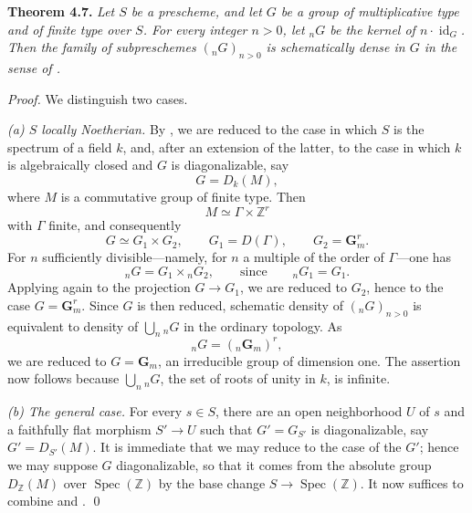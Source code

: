 \medskip
\noindent{}\textbf{Theorem 4.7.}
\textit{Let \(S\) be a prescheme, and let \(G\) be a group of
multiplicative type and of finite type over \(S\). For every integer
\(n>0\), let \({}_nG\) be the kernel of \(n\cdot\operatorname{id}_G\).
Then the family of subpreschemes \(({}_nG)_{n>0}\) is schematically
dense in \(G\) in the sense of
.}

\emph{Proof.}
We distinguish two cases.

\smallskip
{}\noindent\textit{(a) \(S\) locally Noetherian.}
By , we are reduced to the case
in which \(S\) is the spectrum of a field \(k\), and, after an extension
of the latter, to the case in which \(k\) is algebraically closed and
\(G\) is diagonalizable, say
\[
  G=D_k(M),
\]
where \(M\) is a commutative group of finite type. Then
\[
  M\simeq\Gamma\times\mathbb Z^r
\]
with \(\Gamma\) finite, and consequently
\[
  G\simeq G_1\times G_2,
  \qquad
  G_1=D(\Gamma),
  \qquad
  G_2=\mathbf G_m^r.
\]
For \(n\) sufficiently divisible---namely, for \(n\) a multiple of the
order of \(\Gamma\)---one has
\[
  {}_nG=G_1\times{}_nG_2,
  \qquad\text{since}\qquad
  {}_nG_1=G_1.
\]
Applying  again to the projection
\(G\to G_1\), we are reduced to
\(G_2\), hence to the case \(G=\mathbf G_m^r\). Since \(G\) is then
reduced, schematic density of \(({}_nG)_{n>0}\) is equivalent to
density of \(\bigcup_n{}_nG\) in the ordinary topology. As
\[
  {}_nG=({}_n\mathbf G_m)^r,
\]
we are reduced to \(G=\mathbf G_m\), an irreducible group of dimension
one. The assertion now follows because
\(\bigcup_n{}_nG\), the set of roots of unity in \(k\), is infinite.

\smallskip
{}\noindent\textit{(b) The general case.}
For every \(s\in S\), there are an open neighborhood \(U\) of \(s\)
and a faithfully flat morphism \(S'\to U\) such that
\(G'=G_{S'}\) is diagonalizable, say \(G'=D_{S'}(M)\). It is immediate
that we may reduce to the case of the \(G'\); hence we may suppose \(G\)
diagonalizable, so that it comes from the absolute group
\(D_{\mathbb Z}(M)\) over \(\operatorname{Spec}(\mathbb Z)\) by the base
change \(S\to\operatorname{Spec}(\mathbb Z)\). It now suffices to combine
 and
. \qed

